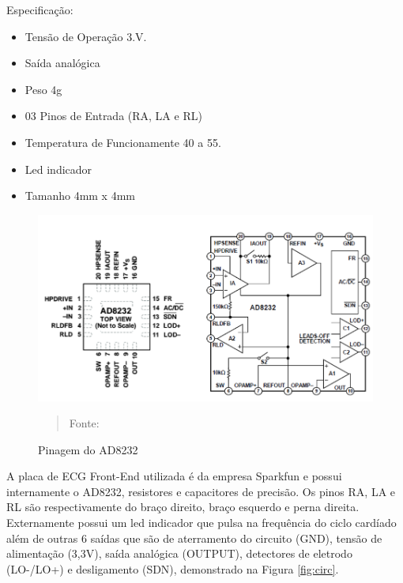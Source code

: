 \documentclass[12pt, a4paper]{article}
\begin{document}
Especificação:
\begin{itemize}
\item Tensão de Operação 3.V.
\item Saída analógica
\item Peso 4g
\item 03 Pinos de Entrada (RA, LA e RL)
\item Temperatura de Funcionamente 40 a 55.%
\item Led indicador
\item Tamanho 4mm x 4mm

\end{itemize}

\begin{figure}[H]
\begin{center}
			\caption{Pinagem do AD8232}
			\includegraphics[width=.9\textwidth]{Figuras/adc.PNG}
            \vspace*{\fill} 
            \begin{quote} 
            \centering 
            Fonte: \cite{analogic}
            \end{quote}
            \vspace*{\fill}
			\label{fig:core}
\end{center}
\end{figure}

A placa de ECG Front-End utilizada é da empresa Sparkfun e possui internamente o AD8232, resistores e capacitores de precisão. Os pinos RA, LA e RL são respectivamente do braço direito, braço esquerdo e perna direita. Externamente possui um led indicador que pulsa na frequência do ciclo cardíado além de outras 6 saídas que são de aterramento do circuito (GND), tensão de alimentação (3,3V), saída analógica (OUTPUT), detectores de eletrodo (LO-/LO+) e desligamento (SDN), demonstrado na Figura \ref{fig:circ}.
\end{document}
